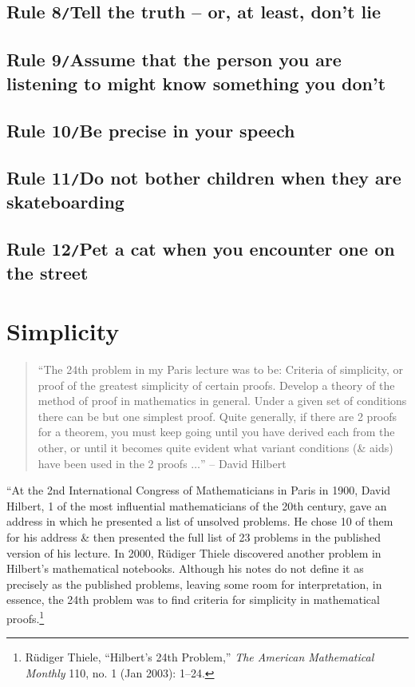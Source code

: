 \documentclass[oneside]{book}
\numberwithin{equation}{section}
\begin{document}
\section{Rule 8\texttt{/}Tell the truth -- or, at least, don't lie}

\section{Rule 9\texttt{/}Assume that the person you are listening to might know something you don't}

\section{Rule 10\texttt{/}Be precise in your speech}

\section{Rule 11\texttt{/}Do not bother children when they are skateboarding}

\section{Rule 12\texttt{/}Pet a cat when you encounter one on the street}


\chapter{Simplicity}

\begin{quotation}
	``The 24th problem in my Paris lecture was to be: Criteria of simplicity, or proof of the greatest simplicity of certain proofs. Develop a theory of the method of proof in mathematics in general. Under a given set of conditions there can be but one simplest proof. Quite generally, if there are 2 proofs for a theorem, you must keep going until you have derived each from the other, or until it becomes quite evident what variant conditions (\& aids) have been used in the 2 proofs $\ldots$'' -- David Hilbert
\end{quotation}
``At the 2nd International Congress of Mathematicians in Paris in 1900, David Hilbert, 1 of the most influential mathematicians of the 20th century, gave an address in which he presented a list of unsolved  problems. He chose 10 of them for his address \& then presented the full list of 23 problems in the published version of his lecture. In 2000, R\"udiger Thiele discovered another problem in Hilbert's mathematical notebooks. Although his notes do not define it as precisely as the published problems, leaving some room for interpretation, in essence, the 24th problem was to find criteria for simplicity in mathematical proofs.\footnote{R\"udiger Thiele, ``Hilbert's 24th Problem,'' \textit{The American Mathematical Monthly} 110, no. 1 (Jan 2003): 1--24.}
\end{document}
